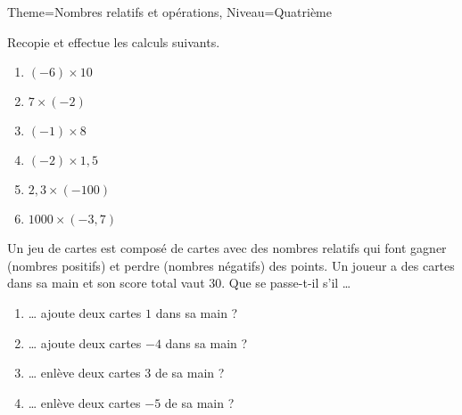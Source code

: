 \documentclass[11pt]{article}
\begin{document}
\begin{Maquette}[Fiche]{Theme=Nombres relatifs et opérations, Niveau=Quatrième}
\begin{multicols}{2}
        \begin{exercice}
            Recopie et effectue les calculs suivants.
            \begin{multicols}{2}

                \begin{enumerate}
                    \item $(-6) \times 10$
                    \item $7 \times (-2)$
                    \item $(-1) \times 8$
                    \item $(-2) \times 1,5$
                    \item $2,3 \times (-100)$
                    \item $1000 \times (-3,7)$
                \end{enumerate}
            \end{multicols}
        \end{exercice}

        \begin{exercice}
            Un jeu de cartes est composé de cartes avec des nombres relatifs qui font gagner (nombres positifs) et perdre (nombres négatifs) des points.
            Un joueur a des cartes dans sa main et son score total vaut $30$.
            Que se passe-t-il s’il …
            \begin{enumerate}
                \item … ajoute deux cartes $1$ dans sa main ?
                \item … ajoute deux cartes $-4$ dans sa main ?
                \item … enlève deux cartes $3$ de sa main ?
                \item … enlève deux cartes $-5$ de sa main ?
            \end{enumerate}
        \end{exercice}


    \end{multicols}


\end{Maquette}
\end{document}
